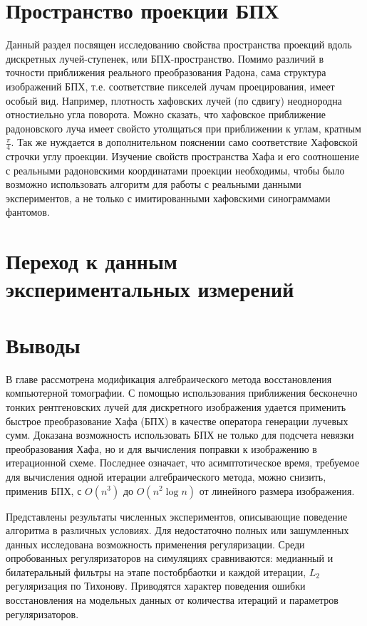\section{Пространство проекции БПХ}
Данный раздел посвящен исследованию свойства пространства проекций вдоль дискретных лучей-ступенек, или БПХ-пространство. 
Помимо различий в точности приближения реального преобразования Радона, сама структура изображений БПХ, т.е. соответствие пикселей лучам проецирования, имеет особый вид.
Например, плотность хафовских лучей (по сдвигу) неоднородна отностиельно угла поворота.
Можно сказать, что хафовское приближение радоновского луча имеет свойсто утолщаться при приближении к углам, кратным $\frac \pi 4$.
Так же нуждается в дополнительном пояснении само соответствие Хафовской строчки углу проекции.
Изучение свойств пространства Хафа и его соотношение с реальными радоновскими координатами проекции необходимы, чтобы было возможно использовать алгоритм для работы с реальными данными экспериментов, а не только с имитированными хафовскими синограммами фантомов.


\section{Переход к данным экспериментальных измерений}


\section{Выводы}
В главе рассмотрена модификация алгебраического метода восстановления компьютерной томографии.
С помощью использования приближения бесконечно тонких рентгеновских лучей для дискретного изображения удается применить быстрое преобразование Хафа (БПХ) в качестве оператора генерации лучевых сумм.
Доказана возможность использовать БПХ не только для подсчета невязки преобразования Хафа, но и для вычисления поправки к изображению в итерационной схеме.
Последнее означает, что асимптотическое время, требуемое для вычисления одной итерации алгебраического метода, можно снизить, применив БПХ, с $O(n^3)$ до $O(n^2 \log n)$ от линейного размера изображения.

Представлены результаты численных экспериментов, описывающие поведение алгоритма в различных условиях.
Для недостаточно полных или зашумленных данных исследована возможность применения регуляризации.
Среди опробованных регуляризаторов на симуляциях сравниваются: медианный и билатеральный фильтры на этапе постобрбаотки и каждой итерации, $L_2$ регуляризация по Тихонову.
Приводятся характер поведения ошибки восстановления на модельных данных от количества итераций и параметров регуляризаторов.
